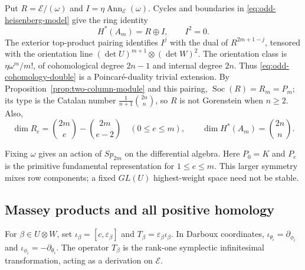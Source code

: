 Put $R=\mathcal E/(\omega)$ and
$I=\eta\operatorname{Ann}_{\mathcal E}(\omega)$. Cycles and
boundaries in \eqref{eq:odd-heisenberg-model} give the ring identity
\begin{equation}\label{eq:odd-cohomology-double}
 H^*(A_m)=R\oplus I,\qquad I^2=0.
\end{equation}
The exterior top-product pairing identifies $I^j$ with the dual of
$R^{2m+1-j}$, tensored with the orientation line
$(\det U)^{m+1}\otimes(\det W)^2$.
The orientation class is $\eta\omega^m/m!$, of cohomological degree
$2n-1$ and internal degree $2n$. Thus \eqref{eq:odd-cohomology-double}
is a Poincar\'e-duality trivial extension. By
Proposition~\ref{prop:two-column-module} and this pairing,
$\operatorname{Soc}(R)=R_m=P_m$; its type is the Catalan number
$\frac1{n+1}\binom{2n}{n}$, so $R$ is not Gorenstein when $n\ge2$.
Also,
\[
 \dim R_e=\binom{2m}{e}-\binom{2m}{e-2}\quad(0\le e\le m),
 \qquad
 \dim H^*(A_m)=\binom{2n}{n}.
\]

Fixing $\omega$ gives an action of $Sp_{2m}$ on the differential
algebra. Here $P_0=K$ and $P_e$ is the primitive fundamental
representation for $1\le e\le m$. This larger symmetry mixes row
components; a fixed $GL(U)$ highest-weight space need not be stable.

\subsection{Massey products and all positive homology}

For $\beta\in U\otimes W$, set
$\iota_\beta=[c,\varepsilon_\beta]$ and
$T_\beta=\varepsilon_\beta\iota_\beta$.
In Darboux coordinates,
$\iota_{\theta_i}=\partial_{\phi_i}$ and
$\iota_{\phi_i}=-\partial_{\theta_i}$.
The operator $T_\beta$ is the rank-one symplectic infinitesimal
transformation, acting as a derivation on $\mathcal E$.

